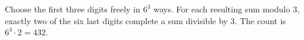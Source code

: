 Choose the first three digits freely in $6^3$ ways. For each resulting sum modulo 3, exactly two of the six last digits complete a sum divisible by 3. The count is $6^3\cdot2=\boxed{432}$.
